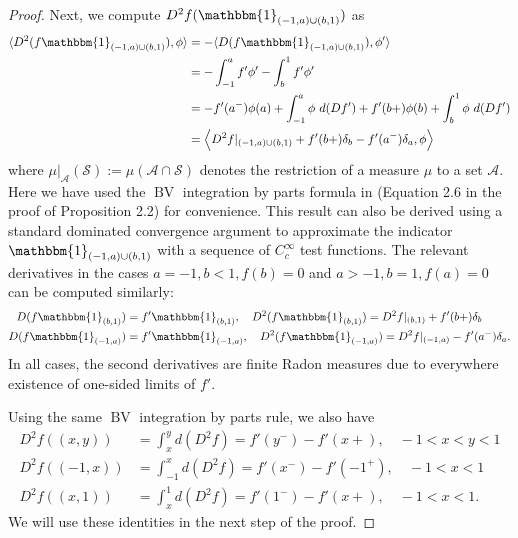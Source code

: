 \documentclass{article}
\DeclareMathOperator{\BV}{BV}
\def\cA{{\mathcal{A}}}
\def\cS{{\mathcal{S}}}
\begin{document}
\begin{appendices}
\begin{proof}
    Next, we compute $D^2 f(\mathbbm{1}_{(-1,a) \cup (b,1)})$ as
    \begin{align} 
        \langle D^2(f \mathbbm{1}_{(-1,a) \cup (b,1)}), \phi \rangle  &= - \langle D(f \mathbbm{1}_{(-1,a) \cup (b,1)}), \phi' \rangle \\
        &= -\int_{-1}^a f' \phi' - \int_b^1 f' \phi' \\
        &= - f'(a^{-}) \phi(a) + \int_{-1}^a \phi \ d(Df') + f'(b+) \phi(b) + \int_b^1 \phi \ d (Df') \\
        &= \Big\langle D^2 f \rvert_{(-1,a) \cup (b,1)} + f'(b+) \delta_b - f'(a^{-}) \delta_a, \phi \Big\rangle
    \end{align}
    where $\mu \rvert_{\cA}(\cS) := \mu(\cA \cap \cS)$ denotes the restriction of a measure $\mu$ to a set $\cA$. Here we have used the $\BV$ integration by parts formula in \cite{rybka2017bv} (Equation 2.6 in the proof of Proposition 2.2) for convenience. This result can also be derived using a standard dominated convergence argument to approximate the indicator $\mathbbm{1}_{(-1,a) \cup (b,1)}$ with a sequence of $C_c^\infty$ test functions. The relevant derivatives in the cases $a = -1, b < 1, f(b) = 0$ and $a > -1, b = 1, f(a) = 0$ can be computed similarly:
    \begin{align} \label{eq:D2_f_a0_b1}
        D(f \mathbbm{1}_{(b,1)}) &= f' \mathbbm{1}_{(b,1)}, \quad D^2(f \mathbbm{1}_{(b,1)}) = D^2 f \rvert_{(b,1)} + f'(b+) \delta_b \\
        D(f \mathbbm{1}_{(-1,a)}) &= f' \mathbbm{1}_{(-1,a)}, \quad D^2(f \mathbbm{1}_{(-1,a)}) = D^2 f \rvert_{(-1,a)} - f'(a^{-}) \delta_a.
    \end{align}
    In all cases, the second derivatives are finite Radon measures due to everywhere existence of one-sided limits of $f'$. 
    
    Using the same $\BV$ integration by parts rule, we also have
    \begin{align} \label{eq:limit_identities}
        D^2 f((x,y)) &= \int_x^y d(D^2 f) = f'(y^{-}) - f'(x+), \quad -1 < x < y < 1 \\
        D^2 f((-1,x)) &= \int_{-1}^x d(D^2 f) = f'(x^{-}) - f'(-1^{+}), \quad -1 < x < 1 \\
        D^2 f((x,1)) &= \int_x^1 d(D^2 f) = f'(1^{-}) - f'(x+), \quad -1 < x < 1.
    \end{align}
    We will use these identities in the next step of the proof.



\end{proof}
\end{appendices}
\end{document}
